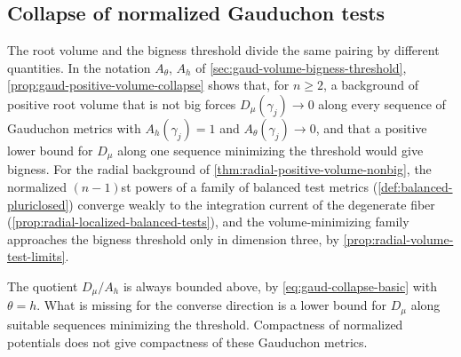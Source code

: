 \subsection{Collapse of normalized Gauduchon tests}
\label{sec:gauduchon-collapse}

The root volume and the bigness threshold divide the same pairing by different quantities. In the notation $A_\theta$, $A_h$ of \cref{sec:gaud-volume-bigness-threshold}, \cref{prop:gaud-positive-volume-collapse} shows that, for $n\geq2$, a background of positive root volume that is not big forces $D_\mu(\gamma_j)\to0$ along every sequence of Gauduchon metrics with $A_h(\gamma_j)=1$ and $A_\theta(\gamma_j)\to0$, and that a positive lower bound for $D_\mu$ along one sequence minimizing the threshold would give bigness. For the radial background of \cref{thm:radial-positive-volume-nonbig}, the normalized $(n-1)$st powers of a family of balanced test metrics (\cref{def:balanced-pluriclosed}) converge weakly to the integration current of the degenerate fiber (\cref{prop:radial-localized-balanced-tests}), and the volume-minimizing family approaches the bigness threshold only in dimension three, by \cref{prop:radial-volume-test-limits}.

The quotient $D_\mu/A_h$ is always bounded above, by \eqref{eq:gaud-collapse-basic} with $\theta=h$. What is missing for the converse direction is a lower bound for $D_\mu$ along suitable sequences minimizing the threshold. Compactness of normalized potentials does not give compactness of these Gauduchon metrics.
